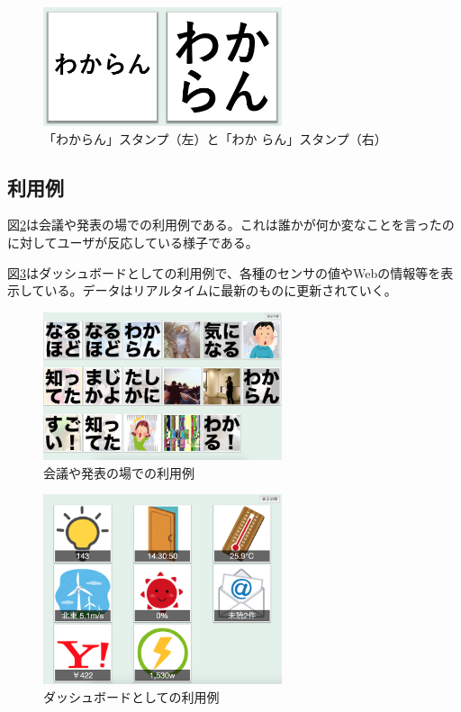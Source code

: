 \begin{figure}[h]
\centering
\includegraphics[width=7cm]{images/wakaran.png}
\caption{「わからん」スタンプ（左）と「わか らん」スタンプ（右）}
\label{wakaran}
\end{figure}

\subsection{利用例}
図\ref{discussion}は会議や発表の場での利用例である。これは誰かが何か変なことを言ったのに対してユーザが反応している様子である。

図\ref{sensors}はダッシュボードとしての利用例で、各種のセンサの値やWebの情報等を表示している。データはリアルタイムに最新のものに更新されていく。

\begin{figure}[h]
\centering
\includegraphics[width=7cm]{images/discussion.png}
\caption{会議や発表の場での利用例}
\label{discussion}
\end{figure}

\begin{figure}[h]
\centering
\includegraphics[width=7cm]{images/sensors.png}
\caption{ダッシュボードとしての利用例}
\label{sensors}
\end{figure}